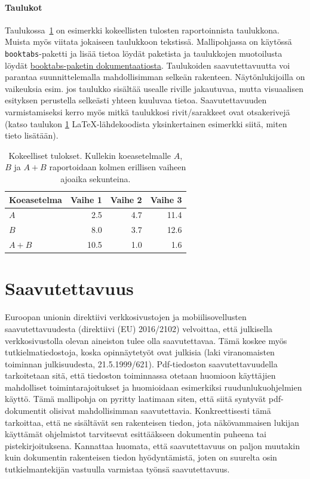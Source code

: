 \documentclass[finnish, manual, a4paper]{csthesis}
\begin{document}
\paragraph{Taulukot}

Taulukossa~\ref{table:results-fi} on esimerkki kokeellisten tulosten raportoinnista taulukkona. Muista myös viitata jokaiseen taulukkoon tekstissä. Mallipohjassa on käytössä \texttt{booktabs}-paketti ja lisää tietoa löydät paketista ja taulukkojen muotoilusta löydät \href{https://ctan.org/pkg/booktabs}{booktabs-paketin dokumentaatiosta}.
%
Taulukoiden saavutettavuutta voi parantaa suunnittelemalla mahdollisimman selkeän rakenteen. Näytönlukijoilla on vaikeuksia esim. jos taulukko sisältää usealle riville jakautuvaa, mutta visuaalisen esityksen perustella selkeästi yhteen kuuluvaa tietoa. Saavutettavuuden varmistamiseksi kerro myös mitkä taulukkosi rivit/sarakkeet ovat otsakerivejä (katso taulukon \ref{table:results-fi} \LaTeX-lähdekoodista yksinkertainen esimerkki siitä, miten tieto lisätään).

\begin{table}[b] %
\centering
\caption{Kokeelliset tulokset. Kullekin koeasetelmalle $A$, $B$ ja $A+B$ raportoidaan kolmen erillisen vaiheen ajoaika sekunteina. \label{table:results-fi}}
\begin{tabular}{l r r r} \toprule
Koeasetelma & Vaihe 1 & Vaihe 2 & Vaihe 3 \\ 
\midrule 
$A$ & 2.5 & 4.7 & 11.4 \\
$B$ & 8.0 & 3.7 & 12.6 \\
$A+B$ & 10.5 & 1.0 & 1.6 \\\bottomrule
%
\end{tabular}
\end{table}

\section{Saavutettavuus}
\label{appendix:saavutettavuus}

Euroopan unionin direktiivi verkkosivustojen ja mobiilisovellusten saavutettavuudesta (direktiivi (EU) 2016/2102) velvoittaa, että julkisella verkkosivustolla olevan aineiston tulee olla saavutettavaa. Tämä koskee myös tutkielmatiedostoja, koska opinnäytetyöt ovat julkisia (laki viranomaisten toiminnan julkisuudesta, 21.5.1999/621). Pdf-tiedoston saavutettavuudella tarkoitetaan sitä, että tiedoston toiminnassa otetaan huomioon käyttäjien mahdolliset toimintarajoitukset ja huomioidaan esimerkiksi ruudunlukuohjelmien käyttö. Tämä mallipohja on pyritty laatimaan siten, että siitä syntyvät pdf-dokumentit olisivat mahdollisimman saavutettavia. Konkreettisesti tämä tarkoittaa, että ne sisältävät sen rakenteisen tiedon, jota näkövammaisen lukijan käyttämät ohjelmistot tarvitsevat esittääkseen dokumentin puheena tai pistekirjoituksena. Kannattaa huomata, että saavutettavuus on paljon muutakin kuin dokumentin rakenteisen tiedon hyödyntämistä, joten on suurelta osin tutkielmantekijän vastuulla varmistaa työnsä saavutettavuus.
\end{document}
